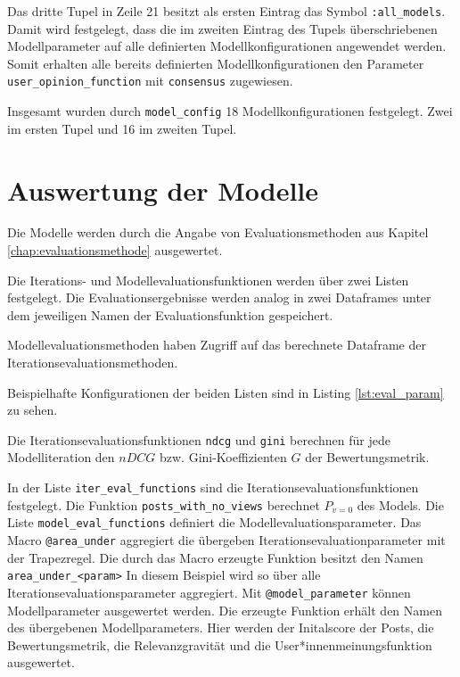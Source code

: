 Das dritte Tupel in Zeile 21 besitzt als ersten Eintrag das Symbol \texttt{:all\_models}. Damit wird festgelegt, dass die im zweiten Eintrag des Tupels überschriebenen Modellparameter auf alle definierten Modellkonfigurationen angewendet werden.
Somit erhalten alle bereits definierten Modellkonfigurationen den Parameter \texttt{user\_opinion\_function} mit \texttt{consensus} zugewiesen.

Insgesamt wurden durch \texttt{model\_config} 18 Modellkonfigurationen festgelegt. Zwei im ersten Tupel und 16 im zweiten Tupel.


\section{Auswertung der Modelle}
\label{sec:auswertung}

Die Modelle werden durch die Angabe von Evaluationsmethoden aus Kapitel \ref{chap:evaluationsmethode} ausgewertet.

Die Iterations- und Modellevaluationsfunktionen werden über zwei Listen festgelegt. Die Evaluationsergebnisse werden analog in zwei Dataframes unter dem jeweiligen Namen der Evaluationsfunktion gespeichert.

Modellevaluationsmethoden haben Zugriff auf das berechnete Dataframe der Iterationsevaluationsmethoden.

Beispielhafte Konfigurationen der beiden Listen sind in Listing \ref{lst:eval_param} zu sehen. 

Die Iterationsevaluationsfunktionen \texttt{ndcg} und \texttt{gini} berechnen für jede Modelliteration den $nDCG$ bzw. Gini-Koeffizienten $G$ der Bewertungsmetrik. 


In der Liste \texttt{iter\_eval\_functions} sind die Iterationsevaluationsfunktionen festgelegt. Die Funktion \texttt{posts\_with\_no\_views} berechnet $P_{v = 0}$ des Models. Die Liste \texttt{model\_eval\_functions} definiert die Modellevaluationsparameter. Das Macro \texttt{@area\_under} aggregiert die übergeben Iterationsevaluationparameter mit der Trapezregel. Die durch das Macro erzeugte Funktion besitzt den Namen \texttt{area\_under\_<param>} In diesem Beispiel wird so über alle Iterationsevaluationsparameter aggregiert. Mit \texttt{@model\_parameter} können Modellparameter ausgewertet werden. Die erzeugte Funktion erhält den Namen des übergebenen Modellparameters. Hier werden der Initalscore der Posts, die Bewertungsmetrik, die Relevanzgravität und die User*innenmeinungsfunktion ausgewertet.



